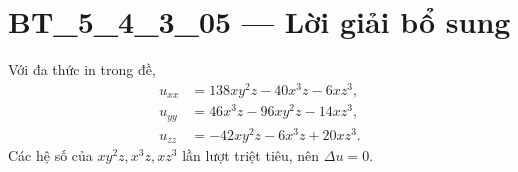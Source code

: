 \documentclass[10pt,a4paper]{article}
\begin{document}
\section*{BT\_5\_4\_3\_05 — Lời giải bổ sung}
Với đa thức in trong đề,
\begin{align*}
u_{xx}&=138xy^2z-40x^3z-6xz^3,\\
u_{yy}&=46x^3z-96xy^2z-14xz^3,\\
u_{zz}&=-42xy^2z-6x^3z+20xz^3.
\end{align*}
Các hệ số của $xy^2z,x^3z,xz^3$ lần lượt triệt tiêu, nên $\Delta u=0$.
\end{document}
